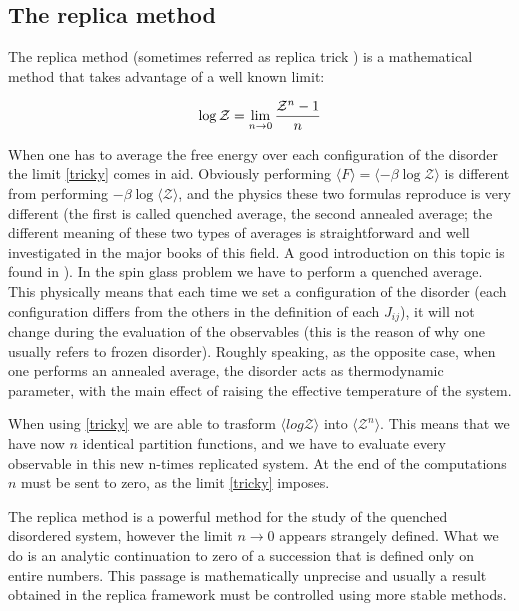 \subsection{The replica method}

The replica method \cite{trick}(sometimes referred as replica trick \cite{critic})  is a mathematical method that takes advantage of a well known limit:

\begin{equation}
\log{ \mathcal{Z} } = \lim_{n\rightarrow 0} {  \mathcal{Z}^n - 1 \over n}
\label{tricky}
\end{equation}

When one has to average the free energy over each configuration of the disorder the limit \ref{tricky} comes in aid. Obviously performing $\langle F \rangle = \langle -\beta\log\mathcal{Z} \rangle$ is different from performing $  -\beta\log \langle\mathcal{Z} \rangle$, and the physics these two formulas reproduce is very different (the first is called quenched average, the second annealed average; the different meaning of these two types of averages is straightforward and well investigated in the major books of this field. A good introduction on this topic is found in \cite{glass}). In the spin glass problem we have to perform a quenched average. This physically means that each time we set a configuration of the disorder (each configuration differs from the others in the definition of each $J_{ij}$), it will not change during the evaluation of the observables (this is the reason of why one usually refers to frozen disorder). Roughly speaking, as the opposite case, when one performs an annealed average, the disorder acts as thermodynamic parameter, with the main effect of raising the effective temperature of the system.

When using \ref{tricky} we are able to trasform $\langle log\mathcal{Z} \rangle$ into $\langle \mathcal{Z}^n \rangle$. This means that we have now $n$ identical partition functions, and we have to evaluate every observable in this new n-times replicated system. At the end of the computations $n$ must be sent to zero, as the limit \ref{tricky} imposes.

The replica method is a powerful method for the study of the quenched disordered system, however the limit $n\rightarrow 0$ appears strangely defined. What we do is an analytic continuation to zero of a succession that is defined only on entire numbers. This passage is mathematically unprecise and usually a result obtained in the replica framework must be controlled using more stable methods.


